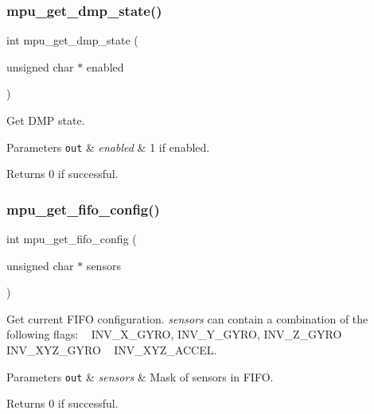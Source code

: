 \subsubsection{mpu\+\_\+get\+\_\+dmp\+\_\+state()}
{\footnotesize\ttfamily int mpu\+\_\+get\+\_\+dmp\+\_\+state (\begin{DoxyParamCaption}\item[{unsigned char $\ast$}]{enabled }\end{DoxyParamCaption})}



Get D\+MP state. 


\begin{DoxyParams}[1]{Parameters}
\mbox{\tt out}  & {\em enabled} & 1 if enabled. \\
\hline
\end{DoxyParams}
\begin{DoxyReturn}{Returns}
0 if successful. 
\end{DoxyReturn}
\mbox{\label{group___d_r_i_v_e_r_s_ga093f11eb10b2639a4b9fe344ea348c54}} 
\subsubsection{mpu\+\_\+get\+\_\+fifo\+\_\+config()}
{\footnotesize\ttfamily int mpu\+\_\+get\+\_\+fifo\+\_\+config (\begin{DoxyParamCaption}\item[{unsigned char $\ast$}]{sensors }\end{DoxyParamCaption})}



Get current F\+I\+FO configuration. {\itshape sensors} can contain a combination of the following flags\+: ~\newline
 I\+N\+V\+\_\+\+X\+\_\+\+G\+Y\+RO, I\+N\+V\+\_\+\+Y\+\_\+\+G\+Y\+RO, I\+N\+V\+\_\+\+Z\+\_\+\+G\+Y\+RO ~\newline
 I\+N\+V\+\_\+\+X\+Y\+Z\+\_\+\+G\+Y\+RO ~\newline
 I\+N\+V\+\_\+\+X\+Y\+Z\+\_\+\+A\+C\+C\+EL. 


\begin{DoxyParams}[1]{Parameters}
\mbox{\tt out}  & {\em sensors} & Mask of sensors in F\+I\+FO. \\
\hline
\end{DoxyParams}
\begin{DoxyReturn}{Returns}
0 if successful. 
\end{DoxyReturn}
\mbox{\label{group___d_r_i_v_e_r_s_gaf973c32c73ba912ff512aab948fc31ca}} 
